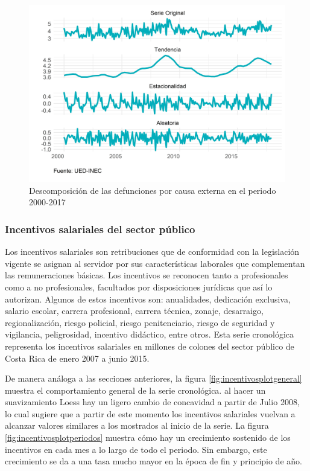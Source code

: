\documentclass[
]{article}
\begin{document}
\begin{figure}[!h]
\includegraphics[width=1\linewidth,height=1\textheight]{Tesis_files/figure-latex/externasplotdescomposicion-1} \caption{Descomposición de las defunciones por causa externa en el periodo 2000-2017}\label{fig:externasplotdescomposicion}
\end{figure}

\subsubsection{Incentivos salariales del sector público}

Los incentivos salariales son retribuciones que de conformidad con la
legislación vigente se asignan al servidor por sus características
laborales que complementan las remuneraciones básicas. Los incentivos se
reconocen tanto a profesionales como a no profesionales, facultados por
disposiciones jurídicas que así lo autorizan. Algunos de estos
incentivos son: anualidades, dedicación exclusiva, salario escolar,
carrera profesional, carrera técnica, zonaje, desarraigo,
regionalización, riesgo policial, riesgo penitenciario, riesgo de
seguridad y vigilancia, peligrosidad, incentivo didáctico, entre otros.
Esta serie cronológica representa los incentivos salariales en millones
de colones del sector público de Costa Rica de enero 2007 a junio 2015.

De manera análoga a las secciones anteriores, la figura
\ref{fig:incentivosplotgeneral} muestra el comportamiento general de la
serie cronológica. al hacer un suavizamiento Loess hay un ligero cambio
de concavidad a partir de Julio 2008, lo cual sugiere que a partir de
este momento los incentivos salariales vuelvan a alcanzar valores
similares a los mostrados al inicio de la serie. La figura
\ref{fig:incentivosplotperiodos} muestra cómo hay un crecimiento
sostenido de los incentivos en cada mes a lo largo de todo el periodo.
Sin embargo, este crecimiento se da a una tasa mucho mayor en la época
de fin y principio de año.
\end{document}
